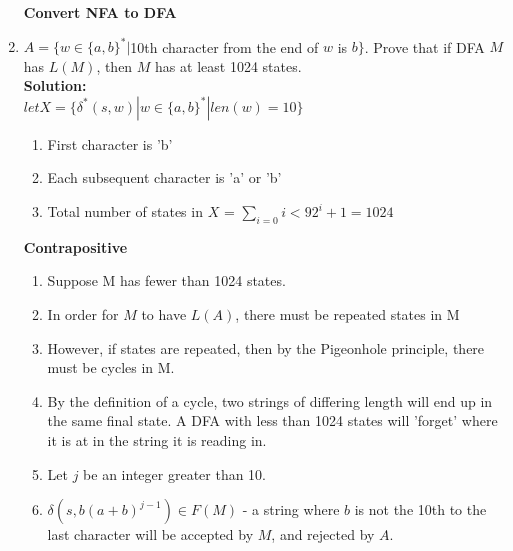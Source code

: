 \documentclass{article}
\begin{document}
\begin{enumerate}
			\textbf{Convert NFA to DFA}\\
		\item $A = \{w \in \{a,b\}^* | $10th character from the end of $w$ is $b\}$. Prove that if DFA $M$ has $L(M)$, then $M$ has at least 1024 states.\\
			\textbf{Solution:}\\
			$let X = \{\delta^*(s,w) | w \in \{a,b\}^* | len(w) = 10\}$\\
			\begin{enumerate}
				\item First character is 'b'\\
				\item Each subsequent character is 'a' or 'b'\\
				\item Total number of states in $X$ = $\sum_{i=0}{i<9}2^i + 1 = 1024$
			\end{enumerate}
			\textbf{Contrapositive}\\
			\begin{enumerate}
				\item Suppose M has fewer than 1024 states.
				\item In order for $M$ to have $L(A)$, there must be repeated states in M
				\item However, if states are repeated, then by the Pigeonhole principle, there must be cycles in M.
				\item By the definition of a cycle, two strings of differing length will end up in the same final state.  A DFA with less than 1024 states will 'forget' where it is at in the string it is reading in.
				\item Let $j$ be an integer greater than 10.
				\item $\delta(s, b(a+b)^{j-1}) \in F(M)$ - a string where $b$ is not the 10th to the last character will be accepted by $M$, and rejected by $A$.
			\end{enumerate}
	\end{enumerate}
\end{document}
